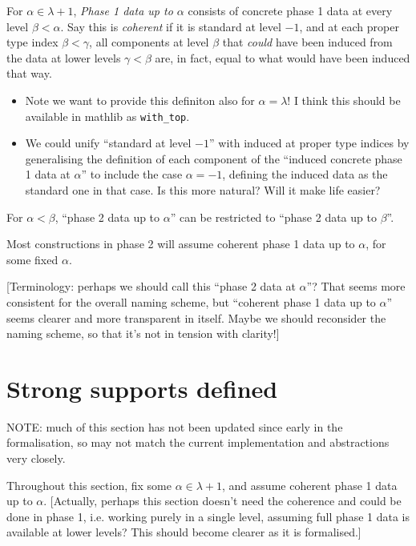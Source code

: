 \begin{definition}
  \label{def:coherent-phase-1-data}
  For $\alpha \in \lambda + 1$, \emph{Phase 1 data up to $\alpha$} consists of concrete phase 1 data at every level $\beta < \alpha$.  Say this is \emph{coherent} if it is standard at level $-1$, and at each proper type index $\beta < \gamma$, all components at level $\beta$ that \emph{could} have been induced from the data at lower levels $\gamma < \beta$ are, in fact, equal to what would have been induced that way.

  \begin{itemize}
  \item Note we want to provide this definiton also for $\alpha = \lambda$!  I think this should be available in mathlib as \verb|with_top|.
  \item We could unify “standard at level $-1$” with induced at proper type indices by generalising the definition of each component of the “induced concrete phase 1 data at $\alpha$” to include the case $\alpha = -1$, defining the induced data as the standard one in that case.  Is this more natural?  Will it make life easier?
  \end{itemize}

  For $\alpha < \beta$, “phase 2 data up to $\alpha$” can be restricted to “phase 2 data up to $\beta$”.

  Most constructions in phase 2 will assume coherent phase 1 data up to $\alpha$, for some fixed $\alpha$.

  [Terminology: perhaps we should call this “phase 2 data at $\alpha$”?  That seems more consistent for the overall naming scheme, but “coherent phase 1 data up to $\alpha$” seems clearer and more transparent in itself.  Maybe we should reconsider the naming scheme, so that it’s not in tension with clarity!]
\end{definition}

\section{Strong supports defined}

NOTE: much of this section has not been updated since early in the formalisation, so may not match the current implementation and abstractions very closely.

Throughout this section, fix some $\alpha \in \lambda + 1$, and assume coherent phase 1 data up to $\alpha$. [Actually, perhaps this section doesn’t need the coherence and could be done in phase 1, i.e. working purely in a single level, assuming full phase 1 data is available at lower levels?  This should become clearer as it is formalised.]

